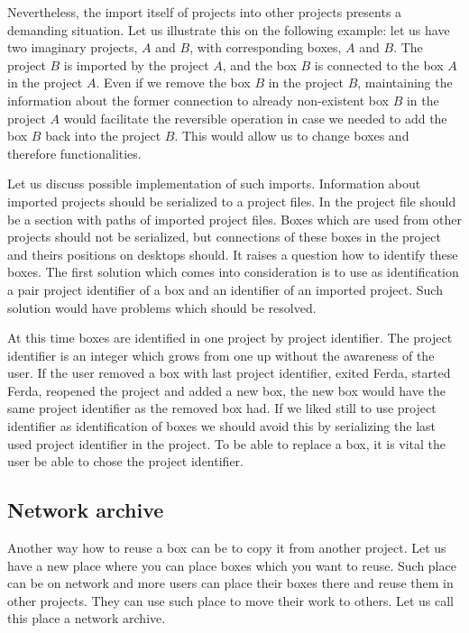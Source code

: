 \documentclass[a4paper,12pt]{book}
\begin{document}
Nevertheless, the import itself of projects into other projects presents a demanding situation. Let us illustrate this on the following example: let us have two imaginary projects, $A$ and $B$, with corresponding boxes, $A$ and $B$. The project $B$ is imported by the project $A$, and the box $B$ is connected to the box $A$ in the project $A$. Even if we remove the box $B$ in the project $B$, maintaining the information about the former connection to already non-existent box $B$ in the project $A$ would facilitate the reversible operation in case we needed to add the box $B$ back into the project $B$. This would allow us to change boxes and therefore functionalities.

Let us discuss possible implementation of such imports. Information about imported projects should be serialized to a project files. In the project file should be a section with paths of imported project files. Boxes which are used from other projects should not be serialized, but connections of these boxes in the project and theirs positions on desktops should. It raises a question how to identify these boxes. The first solution which comes into consideration is to use as identification a pair project identifier of a box and an identifier of an imported project. Such solution would have problems which should be resolved.

At this time boxes are identified in one project by project identifier. The project identifier is an integer which grows from one up without the awareness of the user. If the user removed a box with last project identifier, exited Ferda, started Ferda, reopened the project and added a new box, the new box would have the same project identifier as the removed box had. If we liked still to use project identifier as identification of boxes we should avoid this by serializing the last used project identifier in the project. To be able to replace a box, it is vital the user be able to chose the project identifier.

\subsection{Network archive}
Another way how to reuse a box can be to copy it from another project. Let us have a new place where you can place boxes which you want to reuse. Such place can be on network and more users can place their boxes there and reuse them in other projects. They can use such place to move their work to others. Let us call this place a network archive.
\end{document}
